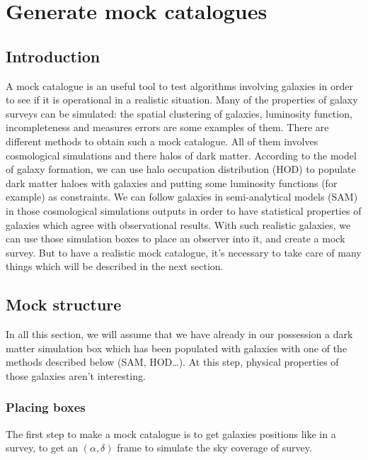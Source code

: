 \chapter{Generate mock catalogues}
\label{cha:mock}

\minitoc%

\section{Introduction}

A mock catalogue is an useful tool to test algorithms involving galaxies in
order to see if it is operational in a realistic situation. Many of the
properties of galaxy surveys can be simulated: the spatial clustering of
galaxies, luminosity function, incompleteness and measures errors are some
examples of them. There are different methods to obtain such a mock catalogue.
All of them involves cosmological simulations and there halos of dark matter.
According to the model of galaxy formation, we can use halo occupation
distribution (HOD) to populate dark matter haloes with galaxies and putting
some luminosity functions (for example) as constraints. We can follow galaxies
in semi-analytical models (SAM) in those cosmological simulations outputs in
order to have statistical properties of galaxies which agree with observational
results. With such realistic galaxies, we can use those simulation boxes to
place an observer into it, and create a mock survey. But to have a realistic
mock catalogue, it's necessary to take care of many things which will be
described in the next section.

\section{Mock structure}

In all this section, we will assume that we have already in our possession a
dark matter simulation box which has been populated with galaxies with one of
the methods described below (SAM, HOD\ldots). At this step, physical properties
of those galaxies aren't interesting.

\subsection{Placing boxes}

The first step to make a mock catalogue is to get galaxies positions like in a
survey, to get an $(\alpha,\delta)$ frame to simulate the sky coverage of
survey.

